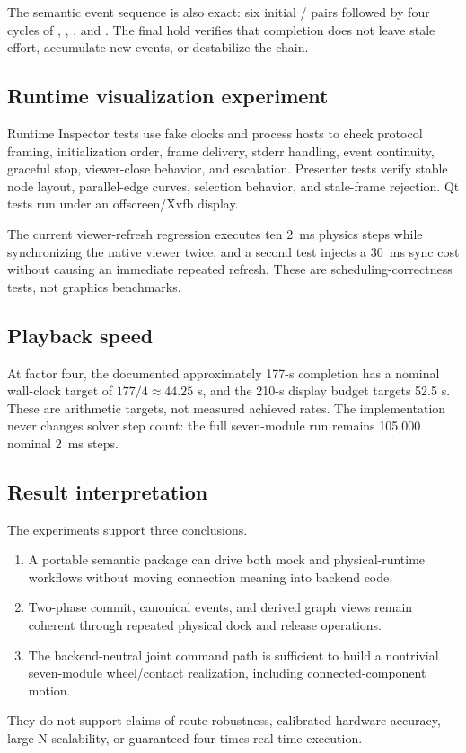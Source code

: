 The semantic event sequence is also exact: six initial
/ pairs followed by four cycles of
, , , and
. The final hold verifies that completion does not leave stale
effort, accumulate new events, or destabilize the chain.

\subsection{Runtime visualization experiment}

Runtime Inspector tests use fake clocks and process hosts to check protocol framing,
initialization order, frame delivery, stderr handling, event continuity, graceful stop,
viewer-close behavior, and escalation. Presenter tests verify stable node layout,
parallel-edge curves, selection behavior, and stale-frame rejection. Qt tests run under
an offscreen/Xvfb display.

The current viewer-refresh regression executes ten \SI{2}{ms} physics steps while
synchronizing the native viewer twice, and a second test injects a \SI{30}{ms} sync cost
without causing an immediate repeated refresh. These are scheduling-correctness tests,
not graphics benchmarks.

\subsection{Playback speed}

At factor four, the documented approximately 177-s completion has a nominal wall-clock
target of $177/4\approx44.25$ s, and the 210-s display budget targets 52.5 s. These are
arithmetic targets, not measured achieved rates. The implementation never changes
solver step count: the full seven-module run remains 105,000 nominal \SI{2}{ms} steps.

\subsection{Result interpretation}

The experiments support three conclusions.

\begin{enumerate}
  \item A portable semantic package can drive both mock and physical-runtime workflows
        without moving connection meaning into backend code.
  \item Two-phase commit, canonical events, and derived graph views remain coherent
        through repeated physical dock and release operations.
  \item The backend-neutral joint command path is sufficient to build a nontrivial
        seven-module wheel/contact realization, including connected-component motion.
\end{enumerate}

They do not support claims of route robustness, calibrated hardware accuracy, large-N
scalability, or guaranteed four-times-real-time execution.

